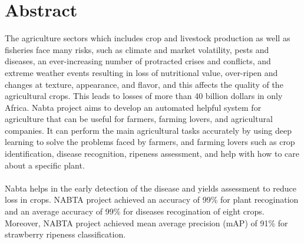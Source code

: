 \chapter*{Abstract}

The agriculture sectors which includes crop and livestock production as 
well as fisheries face many risks, such as climate and market volatility, 
pests and diseases, an ever-increasing number of protracted crises and 
conflicts, and extreme weather events resulting in loss of nutritional 
value, over-ripen and changes at texture, appearance, and flavor, and 
this affects the quality of the agricultural crops. This leads to losses 
of more than 40 billion dollars in only Africa. Nabta project aims to develop 
an automated helpful system for agriculture that can be useful for farmers, 
farming lovers, and agricultural companies. It can perform the main agricultural 
tasks accurately by using deep learning to solve the problems faced by farmers, 
and farming lovers such as crop identification, disease recognition, ripeness 
assessment, and help with how to care about a specific plant.\\\\
Nabta helps in the early detection of the disease and yields assessment to reduce 
loss in crops. NABTA project achieved an accuracy of 99\% for plant recogination 
and an average accuracy of 99\% for diseases recogination of eight crops. Moreover, 
NABTA project achieved mean average precision (mAP) of 91\% for strawberry ripeness 
classification.
